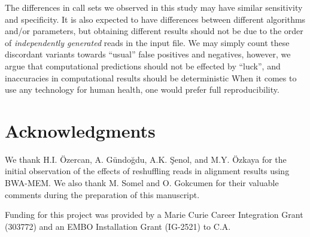\documentclass[10pt,a4paper]{article}
\begin{document}
The differences in call sets we observed in this study 
may have similar sensitivity and specificity.
It is also expected to
have differences between different algorithms and/or parameters, but
obtaining different results should not be due to the order of {\it independently generated} reads in the input file. 
We may simply count these discordant variants towards ``usual'' false positives and negatives, however, 
we argue that computational predictions should not be effected by ``luck'', and inaccuracies in computational results should be deterministic
When it comes to use any technology for human health, one would prefer full reproducibility. 


\section{Acknowledgments}
We thank H.I. Özercan, A. Gündoğdu, A.K. Şenol, and M.Y. Özkaya for the initial observation of the effects of reshuffling reads in alignment results using BWA-MEM. We also thank M. Somel and O. Gokcumen for
their valuable comments during the preparation of this manuscript. 

Funding for this project was provided by a Marie Curie Career Integration Grant (303772) and an 
EMBO Installation Grant (IG-2521) to C.A.

\small






\end{document}
